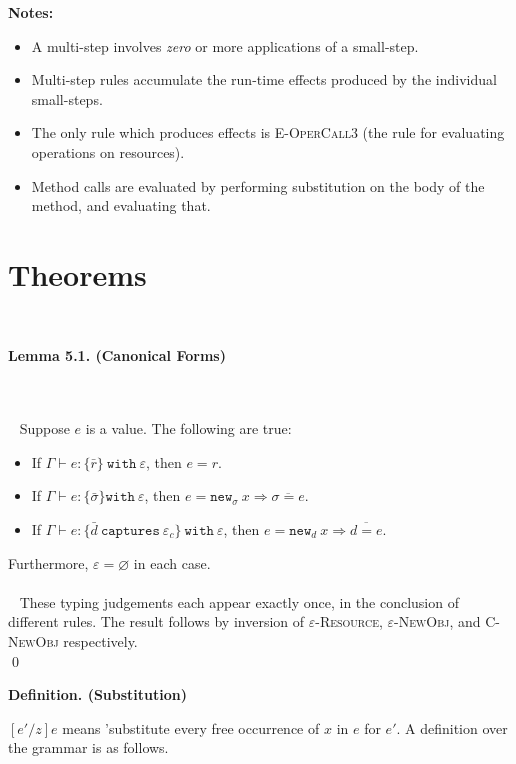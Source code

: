\documentclass{llncs}
\newcommand{\keywadj}[1]{\mathtt{#1}}
\newcommand{\keyw}[1]{\keywadj{#1}~}
\newcommand{\thm}[3]{
	\begin{large}
		\bf{#1}
	\end{large} \\\\
	\fbox{Statement.} ~ #2
	\fbox{Proof.}~ #3 \qed
}
\begin{document}
\noindent \textbf{Notes:}
\begin{itemize}
	\item A multi-step involves \textit{zero} or more applications of a small-step.
	\item Multi-step rules accumulate the run-time effects produced by the individual small-steps.
	\item The only rule which produces effects is \textsc{E-OperCall3} (the rule for evaluating operations on resources).
	\item Method calls are evaluated by performing substitution on the body of the method, and evaluating that.
\end{itemize}

\newpage

\newpage

\section{Theorems}

\ 
\thm{Lemma 5.1. (Canonical Forms)}
{Suppose $e$ is a value. The following are true:
	\begin{itemize}
	\item If $\Gamma \vdash e : \{ \bar r \}~\keyw{with} \varepsilon$, then $e = r$.
	\item If $\Gamma \vdash e : \{ \bar \sigma \} \keyw{with} \varepsilon$, then $e = \keywadj{new}_{\sigma}~x \Rightarrow \overline{\sigma = e}$.
	\item If $\Gamma \vdash e : \{ \bar d~\keyw{captures} \varepsilon_c \}~ \keyw{with} \varepsilon$, then $e = \keywadj{new}_{d}~x \Rightarrow \overline{ d = e }$.
	\end{itemize}
Furthermore, $\varepsilon = \varnothing$ in each case. \\\\
}
{ These typing judgements each appear exactly once, in the conclusion of different rules. The result follows by inversion of \textsc{$\varepsilon$-Resource}, \textsc{$\varepsilon$-NewObj}, and \textsc{C-NewObj} respectively. \\
}



\begin{large}
	\bf{Definition. (Substitution)}
\end{large}

$[e'/z]e$ means 'substitute every free occurrence of $x$ in $e$ for $e'$. A definition over the grammar is as follows.
\end{document}
